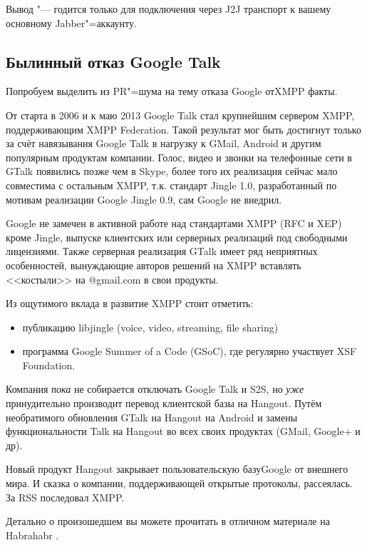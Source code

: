 \documentclass[10pt, a5paper]{article}
\begin{document}
Вывод "--- годится только для подключения через J2J транспорт к вашему основному Jabber"=аккаунту.

\subsection*{Былинный отказ Google Talk}

Попробуем выделить из PR"=шума на тему отказа Google от\linebreak XMPP факты.

От старта в  2006 и к маю 2013 Google Talk стал крупнейшим сервером XMPP, поддерживающим XMPP Federation. Такой результат мог быть достигнут только за счёт навязывания Google Talk в нагрузку к GMail, Android и другим популярным продуктам компании.  Голос, видео и звонки на телефонные сети в GTalk появились позже чем в Skype, более того их реализация сейчас мало совместима с остальным XMPP, т.к. стандарт Jingle 1.0, разработанный по мотивам реализации Google Jingle 0.9, сам Google не внедрил.

Google не замечен в активной работе над стандартами XMPP (RFC и XEP) кроме Jingle, выпуске клиентских или серверных реализаций под свободными лицензиями. Также серверная реализация GTalk имеет ряд неприятных особенностей, вынуждающие авторов решений на XMPP вставлять <<костыли>> на @gmail.com в свои продукты.

Из ощутимого вклада в развитие XMPP стоит отметить:

\begin{itemize}
  \item публикацию libjingle (voice, video, streaming, file sharing)
  \item программа Google Summer of a Code (GSoC), где регулярно участвует XSF Foundation.
\end{itemize}

Компания \emph{пока} не собирается отключать Google Talk и S2S, но \emph{уже} принудительно производит перевод клиентской базы на Hangout. Путём необратимого обновления GTalk на Hangout на Android и замены функциональности Talk на Hangout во всех своих продуктах (GMail, Google+ и др).

Новый продукт Hangout закрывает пользовательскую базу\linebreak Google от внешнего мира. И сказка о компании, поддерживающей открытые протоколы, рассеялась. За RSS последовал XMPP.

Детально о произошедшем вы можете прочитать в отличном материале на Habrahabr \cite{Mendoza3}.
\end{document}
